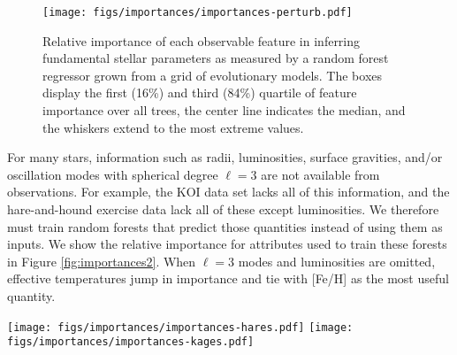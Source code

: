 \documentclass[twocolumn,twocolappendix]{aastex6}
\newcommand{\colwidth}{\linewidth}
\begin{document}
\begin{figure}
    \centering
    \texttt{[image: figs/importances/importances-perturb.pdf]}
    \caption{Relative importance of each observable feature in inferring fundamental stellar parameters as measured by a random forest regressor grown from a grid of evolutionary models. The boxes display the first (16\%) and third (84\%) quartile of feature importance over all trees, the center line indicates the median, and the whiskers extend to the most extreme values.}
    \label{fig:importances}
\end{figure}


For many stars, information such as radii, luminosities, surface gravities, and/or oscillation modes with spherical degree $\ell=3$ are not available from observations. For example, the KOI data set lacks all of this information, and the hare-and-hound exercise data lack all of these except luminosities. We therefore must train random forests that predict those quantities instead of using them as inputs. We show the relative importance for attributes used to train these forests in Figure \ref{fig:importances2}. When $\ell=3$ modes and luminosities are omitted, effective temperatures jump in importance and tie with [Fe/H] as the most useful quantity. 

\begin{figure*}[!hbtp]
    \centering
    \texttt{[image: figs/importances/importances-hares.pdf]}\hfill
    \texttt{[image: figs/importances/importances-kages.pdf]}
    \caption{Box-and-whisker plots of relative importance for each observable feature in measuring fundamental stellar parameters for the hare-and-hound exercise data (left), where luminosities are available; and the \emph{Kepler} objects-of-interest (right), where they are not. Octupole ($\ell=3$) modes have not been measured in any of these stars, so $\langle\delta\nu_{1,3}\rangle$ and $\langle r_{1,3}\rangle$ from evolutionary modelling are not supplied to these random forests. The boxes are sorted by median importance.%
    \label{fig:importances2} }
\end{figure*}
\end{document}
